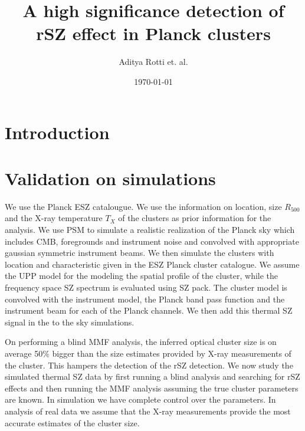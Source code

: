 \documentclass[prl,twocolumn,nofootinbib]{revtex4}
\begin{document}
\title[Relativistic temperature corrections in tSZ analyses]
{A high significance detection of rSZ effect in Planck clusters}

\author{Aditya Rotti et. al.}

%
%



\date{\today}

\begin{abstract}

\end{abstract}


\maketitle


\section{Introduction}
\section{Validation on simulations}
We use the Planck ESZ catalougue. We use the information on location, size $R_{500}$ and the X-ray temperature $T_X$ of the clusters as prior information for the analysis. We use PSM to simulate a realistic realization of the Planck sky which includes CMB, foregrounds and instrument noise and convolved with appropriate gaussian symmetric instrument beams. We then simulate the clusters with location and characteristic given in the ESZ Planck cluster catalogue. We assume the UPP model for the modeling the spatial profile of the cluster, while the frequency space SZ spectrum is evaluated using SZ pack. The cluster model is convolved with the instrument model, the Planck band pass function and the instrument beam for each of the Planck channels. We then add this thermal SZ signal in the to the sky simulations.

On performing a blind MMF analysis, the inferred optical cluster size is on average 50\% bigger than the size estimates provided by X-ray measurements of the cluster. This hampers the detection of the rSZ detection. We now study the simulated thermal SZ data by first running a blind analysis and searching for rSZ effects and then running the MMF analysis assuming the true cluster parameters are known. In simulation we have complete control over the parameters. In analysis of real data we assume that the X-ray measurements provide the most accurate estimates of the cluster size.


\end{document}
